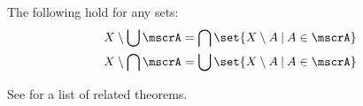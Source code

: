 \begin{theorem}\label{thm:de_morgans_laws_for_sets}
  The following hold for any sets:
  \begin{align}
    X \setminus \bigcup \mscrA = \bigcap \set{ X \setminus A \given A \in \mscrA } \label{eq:thm:de_morgans_laws_for_sets/complement_of_union} \\
    X \setminus \bigcap \mscrA = \bigcup \set{ X \setminus A \given A \in \mscrA } \label{eq:thm:de_morgans_laws_for_sets/complement_of_intersection}
  \end{align}
\end{theorem}
\begin{comments}
  \item See  for a list of related theorems.
\end{comments}
